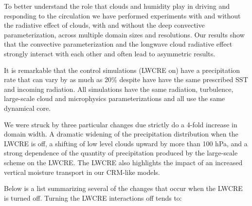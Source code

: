 \documentclass[draft]{agujournal2019}
\begin{document}

To better understand the role that clouds
and humidity play in driving and responding to the circulation we have performed experiments with and without the radiative
effect of clouds, with and without the deep convective parameterization, across multiple domain sizes and resolutions.  
Our results show that the convective 
parameterization and the longwave cloud radiative effect strongly interact with each other and often lead to 
asymmetric results. 

It is remarkable that the control simulations (LWCRE on) have a precipitation rate  that can vary by as much as 
20\% despite have have the same prescribed SST and incoming radiation.  All simulations have the same radiation,
turbulence, large-scale cloud and microphysics parameterizations and all use the same dynamical core.    

We were struck by three particular changes due strictly do a 4-fold increase in domain width.  A dramatic widening of the precipitation distribution when the LWCRE is off, a shifting of low level clouds upward by more than 100 hPa, and 
a strong dependence of the quantity of precipitation produced by the large-scale scheme on the LWCRE.   
The LWCRE also highlights the impact of an increased vertical moisture transport 
in our CRM-like models.  



  

Below is a list summarizing several of the changes that occur when the LWCRE is turned off.  Turning the LWCRE 
interactions off tends to: 
\end{document}
